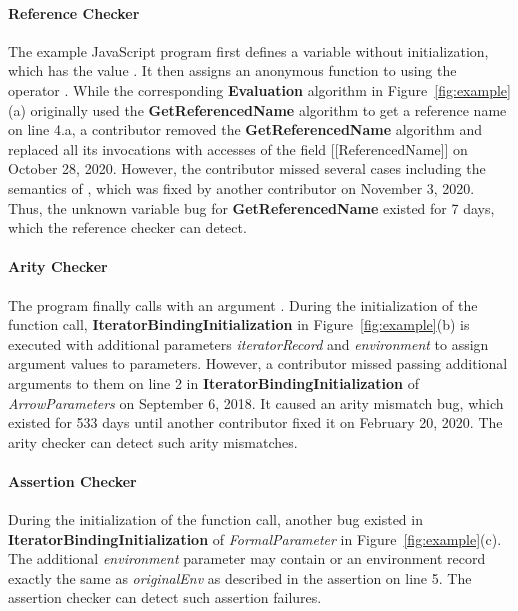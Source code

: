 \paragraph{Reference Checker} The example JavaScript program first defines a
variable  without initialization, which has the value .
It then assigns an anonymous function to  using the operator .
While the corresponding \textbf{Evaluation} algorithm in Figure~\ref{fig:example}(a) originally
used the \textbf{GetReferencedName} algorithm to get a reference name on line 4.a,
a contributor removed the \textbf{GetReferencedName} algorithm and replaced all its
invocations with accesses of the field [[ReferencedName]] on October 28, 2020.
However, the contributor missed several cases including the semantics of
, which was fixed by another contributor on November 3, 2020.
Thus, the unknown variable bug for \textbf{GetReferencedName} existed for 7 days,
which the reference checker can detect.

\paragraph{Arity Checker} The program finally calls  with an argument .
During the initialization of the function call, \textbf{IteratorBindingInitialization}
in Figure~\ref{fig:example}(b) is executed with additional parameters \textit{iteratorRecord} and
\textit{environment} to assign argument values to parameters.
However, a contributor missed passing additional arguments to them on line 2 in
\textbf{IteratorBindingInitialization} of \textit{ArrowParameters} on September 6, 2018.
It caused an arity mismatch bug, which existed for 533 days until another
contributor fixed it on February 20, 2020. The arity checker can detect such arity mismatches.

\paragraph{Assertion Checker} During the initialization of the function call,
another bug existed in \textbf{IteratorBindingInitialization} of
\textit{FormalParameter} in Figure~\ref{fig:example}(c).
The additional \textit{environment} parameter may
contain  or an environment record exactly the same as
\textit{originalEnv} as described in the assertion on line 5.
The assertion checker can detect such assertion failures.


